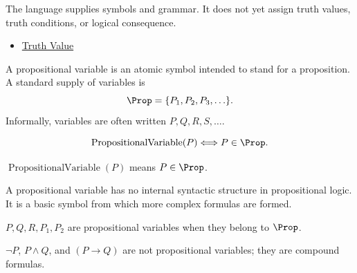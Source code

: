 \begin{remark*}[Interpretation]
The language supplies symbols and grammar. It does not yet assign truth values, truth conditions, or logical consequence.
\end{remark*}

\begin{dependencies}
\begin{itemize}
  \item \hyperref[def:truth-value-propositional-logic]{Truth Value}
\end{itemize}
\end{dependencies}
\begin{tcolorbox}[colback=propbox, colframe=propborder, arc=2pt,
  left=6pt, right=6pt, top=4pt, bottom=4pt,
  title={\small\textbf{Definition (Propositional Variable)}},
  fonttitle=\small\bfseries]
\begin{definition}
\label{def:propositional-variable}
A propositional variable is an atomic symbol intended to stand for a proposition. A standard supply of variables is
\[
\Prop=\{P_1,P_2,P_3,\ldots\}.
\]
Informally, variables are often written \(P,Q,R,S,\ldots\).
\end{definition}
\end{tcolorbox}

\begin{remark*}
\[
\operatorname{PropositionalVariable}(P)\Longleftrightarrow P\in\Prop.
\]
\end{remark*}

\begin{remark*}
\(\operatorname{PropositionalVariable}(P)\) means \(P\in\Prop\).
\end{remark*}

\begin{remark*}[Interpretation]
A propositional variable has no internal syntactic structure in propositional logic. It is a basic symbol from which more complex formulas are formed.
\end{remark*}

\begin{remark*}[Examples]
\(P,Q,R,P_1,P_2\) are propositional variables when they belong to \(\Prop\).
\end{remark*}

\begin{remark*}
\(\neg P\), \(P\land Q\), and \((P\to Q)\) are not propositional variables; they are compound formulas.
\end{remark*}

